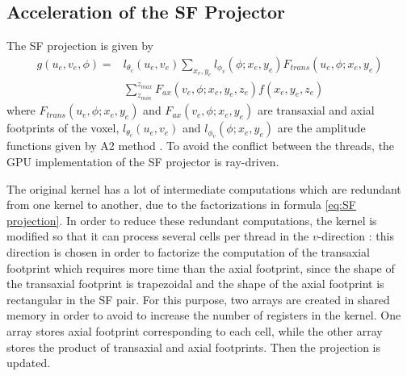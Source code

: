 \documentclass[12pt]{spieman}  %
\begin{document}
\begin{spacing}{1}
\subsection{Acceleration of the SF Projector}

The SF projection is given by\cite{chapdelaine2018new}
\begin{align}
 g(u_e,v_e,\phi) = & l_{\theta_c}(u_e,v_e) \sum_{x_e,y_e} l_{\phi_v}(\phi ; x_e,y_e) F_{trans} (u_e, \phi ;x_e,y_e) 
 \label{eq:SF projection} \\ & \sum_{z_{min}}^{z_{max}} F_{ax} (v_e,\phi;x_e,y_e,z_e) f(x_e,y_e,z_e) \nonumber
\end{align}
where $F_{trans} (u_e, \phi ;x_e,y_e)$ and $F_{ax} (v_e,\phi;x_e,y_e)$ are transaxial and axial footprints of the voxel, $ l_{\theta_c}(u_e,v_e)$ and $l_{\phi_v}(\phi ; x_e,y_e)$
are the amplitude functions given by A2 method \cite{chapdelaine2018new}. 
To avoid the conflict between the threads, the GPU implementation of the SF projector is ray-driven\cite{chapdelaine2018new}.

The original kernel\cite{chapdelaine2018new} has a lot of intermediate computations which are redundant from one kernel to another, due to the factorizations in formula \eqref{eq:SF projection}. In order to reduce these redundant computations, the kernel is modified so that it can process several cells per thread in the $v$-direction : this direction is chosen in order to factorize the computation of the transaxial footprint which requires more time than the axial footprint, since the shape of the transaxial footprint is trapezoidal  and the shape of the axial footprint is rectangular in the SF pair\cite{long20103d}. For this purpose, two arrays are created in shared memory in order to avoid to increase the number of registers in the kernel.
One array stores axial footprint corresponding to each cell, while the other array stores the product of transaxial and axial footprints. Then the projection is updated.


\end{spacing}
\end{document}
